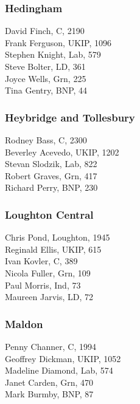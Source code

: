 \documentclass[a4paper,openany,10pt]{book}
\begin{document}
\subsubsection*{Hedingham}



David Finch, C, 2190\\
Frank Ferguson, UKIP, 1096\\
Stephen Knight, Lab, 579\\
Steve Bolter, LD, 361\\
Joyce Wells, Grn, 225\\
Tina Gentry, BNP, 44\\


\subsubsection*{Heybridge and Tollesbury}



Rodney Bass, C, 2300\\
Beverley Acevedo, UKIP, 1202\\
Stevan Slodzik, Lab, 822\\
Robert Graves, Grn, 417\\
Richard Perry, BNP, 230\\


\subsubsection*{Loughton Central}



Chris Pond, Loughton, 1945\\
Reginald Ellis, UKIP, 615\\
Ivan Kovler, C, 389\\
Nicola Fuller, Grn, 109\\
Paul Morris, Ind, 73\\
Maureen Jarvis, LD, 72\\


\subsubsection*{Maldon}



Penny Channer, C, 1994\\
Geoffrey Dickman, UKIP, 1052\\
Madeline Diamond, Lab, 574\\
Janet Carden, Grn, 470\\
Mark Burmby, BNP, 87\\
\end{document}
